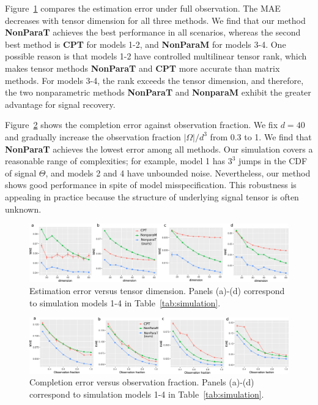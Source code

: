 \documentclass[twoside,11pt]{article}
\theoremstyle{definition}
\begin{document}
Figure~\ref{fig:compare1} compares the estimation error under full observation. The MAE decreases with tensor dimension for all three methods. We find that our method {\bf NonParaT} achieves the best performance in all scenarios, whereas the second best method is {\bf CPT} for models 1-2, and {\bf NonParaM} for models 3-4. One possible reason is that models 1-2 have controlled multilinear tensor rank, which makes tensor methods {\bf NonParaT} and {\bf CPT} more accurate than matrix methods. For models 3-4, the rank exceeds the tensor dimension, and therefore, the two nonparametric methods {\bf NonParaT} and {\bf NonparaM} exhibit the greater advantage for signal recovery. 



Figure~\ref{fig:compare2} shows the completion error against observation fraction. We fix $d=40$ and gradually increase the observation fraction ${|\Omega|/d^3}$ from 0.3 to 1. We find that {\bf NonParaT} achieves the lowest error among all methods. Our simulation covers a reasonable range of  complexities; for example, model 1 has $3^3$ jumps in the CDF of signal $\Theta$, and models 2 and 4 have unbounded noise. Nevertheless, our method shows good performance in spite of model misspecification. This robustness is appealing in practice because the structure of underlying signal tensor is often unknown. 

\begin{figure}[h!]
\includegraphics[width=\textwidth]{figure/fig1-4v2.pdf}
\caption{Estimation error versus tensor dimension. Panels (a)-(d) correspond to simulation models 1-4 in Table~\ref{tab:simulation}.}\label{fig:compare1}
\end{figure}


\begin{figure}[h!]
\includegraphics[width=\textwidth]{figure/fig5-8v2.pdf}
\caption{Completion error versus observation fraction. Panels (a)-(d) correspond to simulation models 1-4 in Table~\ref{tab:simulation}. }\label{fig:compare2}
\end{figure}
\end{document}
